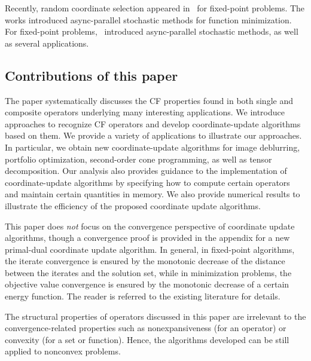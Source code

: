 Recently, random coordinate selection appeared in~\cite{Patrick_2015} for fixed-point problems. The works \cite{nedic2001distributed,recht2011hogwild,liu2013asynchronous,liu2014asynchronous,hsieh2015passcode} introduced async-parallel stochastic methods for function minimization.
For fixed-point problems,~\cite{Peng_2015_AROCK} introduced  async-parallel stochastic methods, as well as several applications.  

\subsection{Contributions of this paper} 
The paper systematically discusses the CF properties found in both single and composite operators underlying many interesting applications. We introduce approaches to recognize CF operators and develop coordinate-update algorithms based on them. 
We provide a variety of applications to illustrate our approaches. 
In particular, we obtain new coordinate-update algorithms for image deblurring, portfolio optimization, second-order cone programming, as well as tensor decomposition. Our analysis also provides guidance to the implementation of coordinate-update algorithms by specifying how to compute certain operators and maintain certain quantities in memory. We also provide numerical results to illustrate the efficiency of the proposed coordinate update algorithms.
 
This paper does \emph{not} focus on the convergence perspective of coordinate update algorithms, though a convergence proof is provided in the appendix for a new primal-dual coordinate update algorithm. In general, in fixed-point algorithms, the iterate convergence is ensured by the monotonic decrease of the distance between the iterates and the solution set, while in minimization problems, the objective value convergence is ensured by the monotonic decrease of a certain energy function. The reader is referred to the existing literature for details. 


The structural properties of operators discussed in this paper are irrelevant to  the convergence-related properties such as nonexpansiveness (for an operator) or convexity (for a set or function). Hence, the algorithms developed can be still applied to nonconvex problems.


